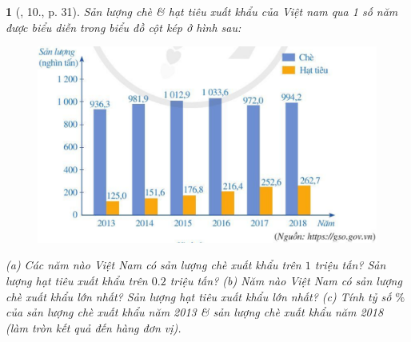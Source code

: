 \documentclass{article}
\newtheorem{baitoan}{}
\begin{document}
\begin{baitoan}[\cite{SGK_Toan_7_Canh_Dieu_tap_1}, 10., p. 31]
	Sản lượng chè \& hạt tiêu xuất khẩu của Việt nam qua 1 số năm được biểu diễn trong biểu đồ cột kép ở hình sau:
	\begin{figure}[H]
		\centering
		\includegraphics[scale=.25]{SGK_Toan_7_CD_tap_1_hinh_10_p31}
	\end{figure}
	\noindent(a) Các năm nào Việt Nam có sản lượng chè xuất khẩu trên $1$ triệu tấn? Sản lượng hạt tiêu xuất khẩu trên $0.2$ triệu tấn? (b) Năm nào Việt Nam có sản lượng chè xuất khẩu lớn nhất? Sản lượng hạt tiêu xuất khẩu lớn nhất? (c) Tính tỷ số $\%$ của sản lượng chè xuất khẩu năm 2013 \& sản lượng chè xuất khẩu năm 2018 (làm tròn kết quả đến hàng đơn vị). 
\end{baitoan}


\printbibliography[heading=bibintoc]
\end{document}

